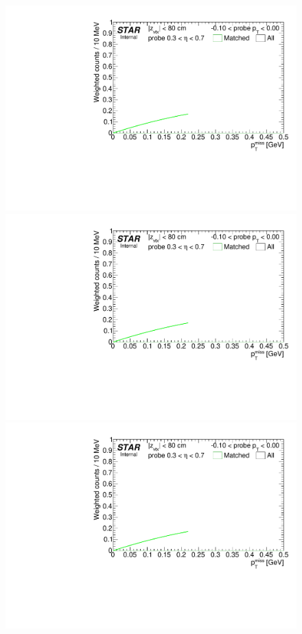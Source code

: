 \begin{figure}[ht]
{}~
\parbox{0.24\textwidth}{
  \centering
  \includegraphics[width=\linewidth,page=6]{graphics/correctionsToEff/TOF_tagAndProbe/Fitting_effVsPt_mc_ETABINS_A.CPT2.pdf}\\
  \includegraphics[width=\linewidth,page=8]{graphics/correctionsToEff/TOF_tagAndProbe/Fitting_effVsPt_mc_ETABINS_A.CPT2.pdf}\\
  \includegraphics[width=\linewidth,page=10]{graphics/correctionsToEff/TOF_tagAndProbe/Fitting_effVsPt_mc_ETABINS_A.CPT2.pdf}\\[84pt]

}%
\end{figure}
